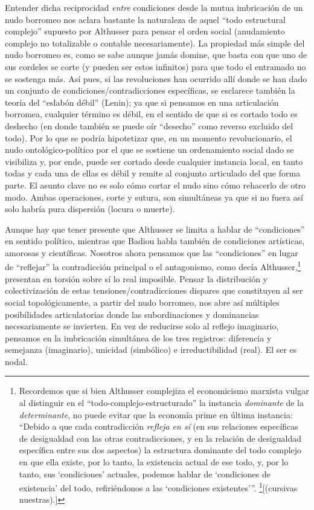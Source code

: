Entender dicha reciprocidad \emph{entre} condiciones desde la mutua imbricación de un nudo borromeo nos aclara bastante la naturaleza de aquel \enquote{todo estructural complejo} supuesto por Althusser para pensar el orden social (anudamiento complejo no totalizable o contable necesariamente). La propiedad más simple del nudo borromeo es, como se sabe aunque jamás domine, que basta con que uno de sus cordeles se corte (y pueden ser estos infinitos) para que todo el entramado no se sostenga más. Así pues, si las revoluciones han ocurrido allí donde se han dado un conjunto de condiciones/contradicciones específicas, se esclarece también la teoría del \enquote{eslabón débil} (Lenin); ya que si pensamos en una articulación borromea, cualquier término es débil, en el sentido de que si es cortado todo es deshecho (en donde también se puede oír \enquote{desecho} como reverso excluido del todo). Por lo que se podría hipotetizar que, en un momento revolucionario, el nudo ontológico-político por el que se sostiene un ordenamiento social dado se visibiliza y, por ende, puede ser cortado desde cualquier instancia local, en tanto todas y cada una de ellas es débil y remite al conjunto articulado del que forma parte. El asunto clave no es solo cómo cortar el nudo sino cómo rehacerlo de otro modo. Ambas operaciones, corte y sutura, son simultáneas ya que si no fuera así solo habría pura dispersión (locura o muerte).

Aunque hay que tener presente que Althusser se limita a hablar de \enquote{condiciones} en sentido político, mientras que Badiou habla también de condiciones artísticas, amorosas y científicas. Nosotros ahora pensamos que las \enquote{condiciones} en lugar de \enquote{reflejar} la contradicción principal o el antagonismo, como decía Althusser,\footnote{Recordemos que si bien Althusser complejiza el economicismo marxista vulgar al distinguir en el \enquote{todo-complejo-estructurado} la instancia \emph{dominante} de la \emph{determinante}, no puede evitar que la economía prime en última instancia: \enquote{Debido a que cada contradicción \emph{refleja en sí} (en sus relaciones específicas de desigualdad con las otras contradicciones, y en la relación de desigualdad específica entre sus dos aspectos) la estructura dominante del todo complejo en que ella existe, por lo tanto, la existencia actual de ese todo, y, por lo tanto, sus \enquote{condiciones} actuales, podemos hablar de \enquote{condiciones de existencia} del todo, refiriéndonos a las \enquote{condiciones existentes}}. \footcite[172]{@7051-ALTHUSSER1965}[(cursivas nuestras).]} presentan en torsión sobre sí  lo real imposible. Pensar la distribución y colectivización de estas tensiones/contradicciones dispares que constituyen al ser social topológicamente, a partir del nudo borromeo, nos abre así múltiples posibilidades articulatorias donde las subordinaciones y dominancias necesariamente se invierten. En vez de reducirse solo al reflejo imaginario, pensamos en la imbricación simultánea de los tres registros: diferencia y semejanza (imaginario), unicidad (simbólico) e irreductibilidad (real). El ser es nodal.

